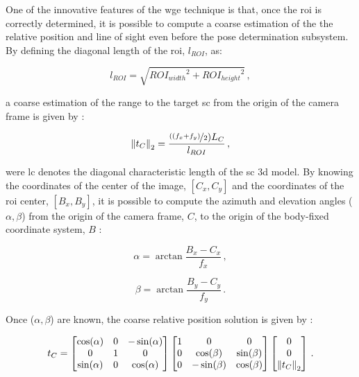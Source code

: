 One of the innovative features of the \acrshort{wge} technique is that, once the \acrshort{roi} is correctly determined, it is possible to compute a coarse estimation of the the relative position and line of sight even before the pose determination subsystem. By defining the diagonal length of the \acrshort{roi}, $l_{ROI}$, as:

\begin{equation}
  l_{ROI} = \sqrt{{ROI_{width}}^2 + {ROI_{height}}^2} \,,
\end{equation}

a coarse estimation of the range to the target \acrshort{sc} from the origin of the camera frame is given by :

\begin{equation}
  \left\lVert t_C\right\rVert_2 = \frac{\nicefrac{((f_x+f_y)}{2}) L_C}{l_{ROI}} \,,
\end{equation}

were \gls{lc} denotes the diagonal characteristic length of the \acrshort{sc} \acrshort{3d} model. By knowing the coordinates of the center of the image, $[C_x, C_y]$ and the coordinates of the \acrshort{roi} center, $[B_x, B_y]$, it is possible to compute the azimuth and elevation angles ($\alpha, \beta$) from the origin of the camera frame, $C$, to the origin of the body-fixed coordinate system, $B$ :

\begin{equation}
  \alpha = \arctan{\frac{B_x - C_x}{f_x}} \,,
\end{equation}

\begin{equation}
  \beta = \arctan{\frac{B_y - C_y}{f_y}} \,.
\end{equation}

Once ($\alpha, \beta$) are known, the coarse relative position solution is given by :

\begin{equation}
  t_C
  =
  \begin{bmatrix}
    \cos(\alpha) & 0 & -\sin(\alpha) \\
    0            & 1 & 0             \\
    \sin(\alpha) & 0 & \cos(\alpha)
  \end{bmatrix}
  \begin{bmatrix}
    1 & 0            & 0           \\
    0 & \cos(\beta)  & \sin(\beta) \\
    0 & -\sin(\beta) & \cos(\beta)
  \end{bmatrix}
  \begin{bmatrix}
    0            \\
    0            \\
    \left\lVert t_C\right\rVert_2
  \end{bmatrix} \,.
\end{equation}

